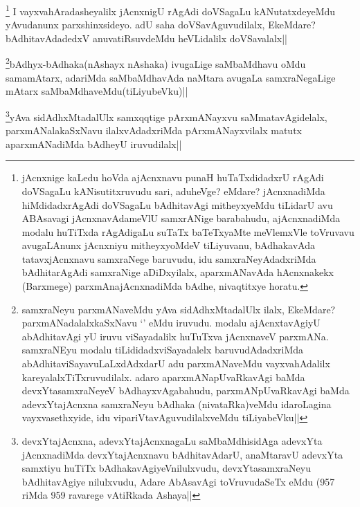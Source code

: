 \begin{artha}
\footnote{jAcnxnige kaLedu hoVda ajAcnxnavu punaH huTaTxdidadxrU rAgAdi doVSagaLu kANisutitxruvudu sari, aduheVge? eMdare? jAcnxnadiMda hiMdidadxrAgAdi doVSagaLu bAdhitavAgi mitheyxyeMdu tiLidarU avu ABAsavagi jAcnxnavAdameVlU samxrANige barabahudu, ajAcnxnadiMda modalu huTiTxda rAgAdigaLu suTaTx baTeTxyaMte meVlemxVle toVruvavu avugaLAnunx jAcnxniyu mitheyxyoMdeV tiLiyuvanu, bAdhakavAda tatavxjAcnxnavu samxraNege baruvudu, idu samxraNeyAdadxriMda bAdhitarAgAdi samxraNige aDiDxyilalx, aparxmANavAda hAcnxnakekx (Barxmege) parxmAnajAcnxnadiMda bAdhe, nivaqtitxye horatu.} I vayxvahAradasheyalilx jAcnxnigU rAgAdi doVSagaLu kANutatxdeyeMdu yAvudanunx parxshinxsideyo. adU saha doVSavAguvudilalx, EkeMdare? bAdhitavAdadedxV anuvatiRsuvdeMdu heVLidalilx doVSavalalx||
\end{artha}


\begin{artha}
\footnote{samxraNeyu parxmANaveMdu yAva sidAdhxMtadalUlx ilalx, EkeMdare? parxmANadalalxkaSxNavu `\stext' eMdu iruvudu. modalu ajAcnxtavAgiyU abAdhitavAgi yU iruvu viSayadalilx huTuTxva jAcnxnaveV parxmANa. samxraNEyu modalu tiLididadxviSayadalelx baruvudAdadxriMda abAdhitaviSayavuLaLxdAdxdarU adu parxmANaveMdu vayxvahAdalilx kareyalalxTiTxruvudilalx. adaro aparxmANapUvaRkavAgi baMda devxYtasamxraNeyeV bAdhayxvAgabahudu, parxmANpUvaRkavAgi baMda adevxYtajAcnxna samxraNeyu bAdhaka (nivataRka)veMdu idaroLagina vayxvasethxyide, idu vipariVtavAguvudilalxveMdu tiLiyabeVku||}bAdhyx-bAdhaka(nAshayx nAshaka) ivugaLige saMbaMdhavu oMdu samamAtarx, adariMda saMbaMdhavAda naMtara avugaLa samxraNegaLige mAtarx saMbaMdhaveMdu(tiLiyubeVku)||
\end{artha}


\begin{artha}
\footnote{devxYtajAcnxna, adevxYtajAcnxnagaLu saMbaMdhisidAga adevxYta jAcnxnadiMda devxYtajAcnxnavu bAdhitavAdarU, anaMtaravU adevxYta samxtiyu huTiTx bAdhakavAgiyeVnilulxvudu, devxYtasamxraNeyu bAdhitavAgiye nilulxvudu, Adare AbAsavAgi toVruvudaSeTx eMdu (957 riMda 959 ravarege vAtiRkada Ashaya||}yAva sidAdhxMtadalUlx samxqqtige pArxmANayxvu saMmatavAgidelalx, parxmANalakaSxNavu ilalxvAdadxriMda pArxmANayxvilalx matutx aparxmANadiMda bAdheyU iruvudilalx||
\end{artha}

